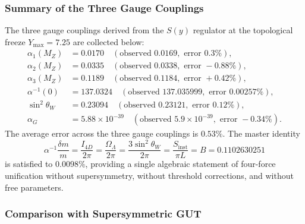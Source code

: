 \documentclass[12pt,oneside,openany]{book}
\begin{document}
\subsubsection{Summary of the Three Gauge Couplings}

The three gauge couplings derived from the $S(y)$ regulator at the topological freeze $Y_{\max} = 7.25$ are collected below:
\begin{equation}
\boxed{
\begin{aligned}
\alpha_1(M_Z) &= 0.0170 \quad (\text{observed } 0.0169, \text{ error } 0.3\%), \\
\alpha_2(M_Z) &= 0.0335 \quad (\text{observed } 0.0338, \text{ error } -0.88\%), \\
\alpha_3(M_Z) &= 0.1189 \quad (\text{observed } 0.1184, \text{ error } +0.42\%), \\
\alpha^{-1}(0) &= 137.0324 \quad (\text{observed } 137.035999, \text{ error } 0.00257\%), \\
\sin^2\theta_W &= 0.23094 \quad (\text{observed } 0.23121, \text{ error } 0.12\%), \\
\alpha_G &= 5.88 \times 10^{-39} \quad (\text{observed } 5.9 \times 10^{-39}, \text{ error } -0.34\%).
\end{aligned}}
\label{eq:summary-gut}
\end{equation}
The average error across the three gauge couplings is $0.53\%$. The master identity
\begin{equation}
\alpha^{-1}\frac{\delta m}{m} = \frac{I_{4D}}{2\pi} = \frac{\Omega_\Lambda}{2\pi} = \frac{3\sin^2\theta_W}{2\pi} = \frac{S_{\mathrm{inst}}}{\pi L} = B = 0.1102630251
\label{eq:master-restated}
\end{equation}
is satisfied to $0.0098\%$, providing a single algebraic statement of four-force unification without supersymmetry, without threshold corrections, and without free parameters.

\subsubsection{Comparison with Supersymmetric GUT}
\end{document}
